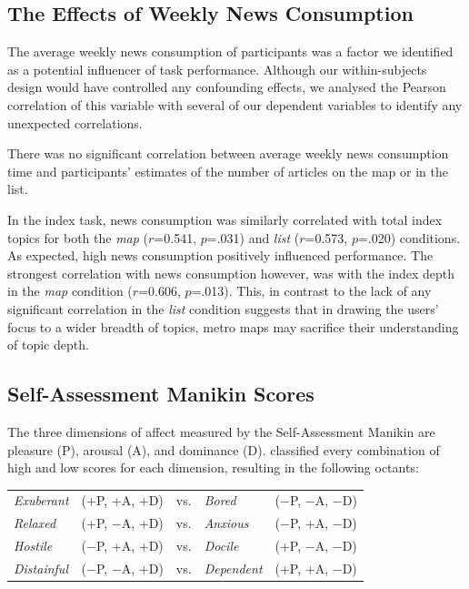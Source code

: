 \subsection{The Effects of Weekly News Consumption}

The average weekly news consumption of participants was a factor we identified as a potential influencer of task performance. Although our within-subjects design would have controlled any confounding effects, we analysed the Pearson correlation of this variable with several of our dependent variables to identify any unexpected correlations.

There was no significant correlation between average weekly news consumption time and participants' estimates of the number of articles on the map or in the list.

In the index task, news consumption was similarly correlated with total index topics for both the \textit{map} ($r$=0.541, $p$=.031) and \textit{list} ($r$=0.573, $p$=.020) conditions. As expected, high news consumption positively influenced performance. The strongest correlation with news consumption however, was with the index depth in the \textit{map} condition ($r$=0.606, $p$=.013). This, in contrast to the lack of any significant correlation in the \textit{list} condition suggests that in drawing the users' focus to a wider breadth of topics, metro maps may sacrifice their understanding of topic depth.

\subsection{Self-Assessment Manikin Scores}

The three dimensions of affect measured by the Self-Assessment Manikin \citep{measuringemotion} are pleasure (P), arousal (A), and dominance (D). \cite{emotionbasedtheory} classified every combination of high and low scores for each dimension, resulting in the following octants:

\begin{table}[htbp!]
\centering
\begin{tabular}{lllll}
\textit{Exuberant} & (+P, +A, +D) & vs. & \textit{Bored} & ($-$P, $-$A, $-$D) \\
\textit{Relaxed} & (+P, $-$A, +D) & vs. & \textit{Anxious} & ($-$P, +A, $-$D) \\
\textit{Hostile} & ($-$P, +A, +D) & vs. & \textit{Docile} & (+P, $-$A, $-$D) \\
\textit{Distainful} & ($-$P, $-$A, +D) & vs. & \textit{Dependent} & (+P, +A, $-$D)
\end{tabular}
\end{table}

